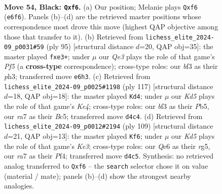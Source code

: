 \documentclass[11pt]{article}
\begin{document}
\clearpage

\begin{figure}[p]\centering
\begin{subfigure}{0.46\textwidth}\centering
\resizebox{\linewidth}{!}{%
\newchessgame
\chessboard[
  setfen={8/R7/4qP2/8/1p1k4/b4BK1/8/8 b - - 0 54},
  showmover=false,
  pgfstyle=straightmove, color=movearrow, markmove={e6-f6}
]}
\caption{}
\end{subfigure}\hfill
\begin{subfigure}{0.46\textwidth}\centering
\resizebox{\linewidth}{!}{%
\newchessgame
\chessboard[
  setfen={8/6k1/8/R7/5p2/1p2P2P/b4K2/8 b - - 0 48},
  showmover=false,
  pgfstyle=straightmove, color=movearrow, markmove={f4-e3}
]}
\caption{}
\end{subfigure}
\\[4pt]
\begin{subfigure}{0.46\textwidth}\centering
\resizebox{\linewidth}{!}{%
\newchessgame
\chessboard[
  setfen={8/8/8/1pb1k2p/2b5/8/6K1/2R5 b - - 7 59},
  showmover=false,
  pgfstyle=straightmove, color=movearrow, markmove={e5-d4}
]}
\caption{}
\end{subfigure}\hfill
\begin{subfigure}{0.46\textwidth}\centering
\resizebox{\linewidth}{!}{%
\newchessgame
\chessboard[
  setfen={8/8/4k3/6R1/5p2/3K1Pb1/6P1/1r6 b - - 3 55},
  showmover=false,
  pgfstyle=straightmove, color=movearrow, markmove={e6-f6}
]}
\caption{}
\end{subfigure}
\caption{\textbf{Move 54, Black: \texttt{Qxf6}.} (a) Our position; Melanie plays \texttt{Qxf6} (\texttt{e6f6}). Panels (b)--(d) are the retrieved master positions whose correspondence most drove this move (highest QAP objective among those that transfer to it). (b) Retrieved from \texttt{lichess\_elite\_2024-09\_p0031\#59} (ply 95) [structural distance $d$=20, QAP obj=35]: the master played \texttt{fxe3+}; under $\mu$ our \emph{Qe3} plays the role of that game's \emph{Pf5} (a \textbf{cross-type} correspondence); cross-type roles: our \emph{b}f3 as their \emph{p}h3; transferred move \texttt{e6h3}. (c) Retrieved from \texttt{lichess\_elite\_2024-09\_p0025\#1198} (ply 117) [structural distance $d$=18, QAP obj=18]: the master played \texttt{Kd4}; under $\mu$ our \emph{Kd5} plays the role of that game's \emph{Ke4}; cross-type roles: our \emph{b}f3 as their \emph{P}b5, our \emph{r}a7 as their \emph{B}c5; transferred move \texttt{d4c4}. (d) Retrieved from \texttt{lichess\_elite\_2024-09\_p0012\#2194} (ply 109) [structural distance $d$=21, QAP obj=13]: the master played \texttt{Kf6}; under $\mu$ our \emph{Kd5} plays the role of that game's \emph{Ke3}; cross-type roles: our \emph{Q}e6 as their \emph{r}g5, our \emph{r}a7 as their \emph{P}f4; transferred move \texttt{d4c5}. Synthesis: no retrieved analog transferred to \texttt{Qxf6} -- the \texttt{search} selector chose it on value (material / mate); panels (b)--(d) show the strongest nearby analogies.}
\label{fig:thought-m107}
\end{figure}
\end{document}
